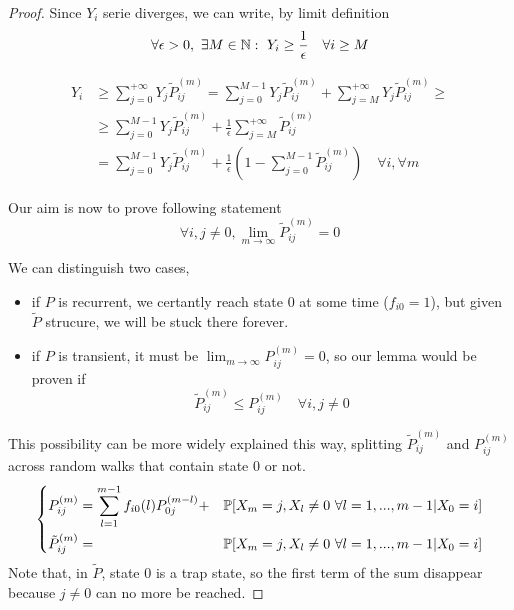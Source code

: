 \begin{proof}
		\proofpart \label{part:Yi_lower_bound}
			Since $Y_i$ serie diverges, we can write, by limit definition
			$$ \forall \epsilon > 0, ~\exists M \in \mathbb{N} : ~Y_i \ge \frac{1}{\epsilon} \quad \forall i \ge M$$

			\begin{equation}\begin{split}
				Y_i & \ge \sum_{j=0}^{+\infty} Y_j \tilde{P}_{ij}^{(m)}
					= \sum_{j=0}^{M-1} Y_j \tilde{P}_{ij}^{(m)}
					+ \sum_{j=M}^{+\infty} Y_j \tilde{P}_{ij}^{(m)} \ge \\
				& \ge \sum_{j=0}^{M-1} Y_j \tilde{P}_{ij}^{(m)}
					+ \frac{1}{\epsilon} \sum_{j=M}^{+\infty} \tilde{P}_{ij}^{(m)} \\
				& = \sum_{j=0}^{M-1} Y_j \tilde{P}_{ij}^{(m)}
					+ \frac{1}{\epsilon} \left( 1 - \sum_{j=0}^{M-1}\tilde{P}_{ij}^{(m)} \right) \quad \forall i, \forall m
			\end{split}\end{equation}

		\proofpart
			Our aim is now to prove following statement
			$$ \forall i,j \neq 0, \lim_{m \to \infty} \tilde{P}_{ij}^{(m)} = 0 $$

			We can distinguish two cases,
			\begin{itemize}
				\item if $P$ is recurrent, we certantly reach state 0 at some time ($f_{i0} = 1$), but given $\tilde{P}$ strucure, we will be stuck there forever.
				\item if $P$ is transient, it must be $\lim_{m \to \infty} P_{ij}^{(m)} = 0 $, so our lemma would be proven if
				$$ \tilde{P}_{ij}^{(m)} \le P_{ij}^{(m)} \quad\forall i, j \neq 0$$
			\end{itemize}

			This possibility can be more widely explained this way, splitting $\tilde{P}_{ij}^{(m)}$ and $P_{ij}^{(m)}$ across random walks	 that contain state 0 or not.
			\begin{equation}
				\left\{ \begin{split}
					& P_{ij}^{(m)} = \sum_{l=1}^{m-1} f_{i0}(l) P_{0j}^{(m-l)} +
						& \mathbb{P}[X_m = j, X_l \neq 0 ~ \forall l = 1, ..., m-1 | X_0 = i] \\
					& \tilde{P}_{ij}^{(m)} =
						& \mathbb{P}[X_m = j, X_l \neq 0 ~ \forall l = 1, ..., m-1 | X_0 = i] \\
				\end{split} \right.
			\end{equation}
			Note that, in $\tilde{P}$, state $0$ is a trap state, so the first term of the sum disappear because $j \neq 0$ can no more be reached.


\end{proof}
